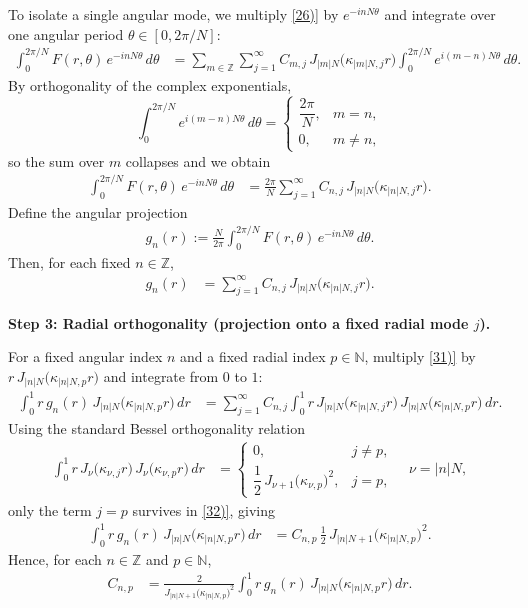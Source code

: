 \documentclass{article}
\begin{document}
To isolate a single angular mode, we multiply \eqref{26)} by
\(e^{-i nN\theta}\) and integrate over one angular period
\(\theta \in [0,2\pi/N]\):
\begin{align}
\int_0^{2\pi/N} F(r,\theta)\,e^{-i nN\theta}\,d\theta
&=
\sum_{m\in\mathbb{Z}}\sum_{j=1}^{\infty}
C_{m,j}\,J_{|m|N}\bigl(\kappa_{|m|N,j} r\bigr)
\int_0^{2\pi/N} e^{i (m-n)N\theta}\,d\theta. \tag{28)}
\end{align}
By orthogonality of the complex exponentials,
\[
\int_0^{2\pi/N} e^{i (m-n)N\theta}\,d\theta
=
\begin{cases}
\dfrac{2\pi}{N}, & m=n,\\[0.4em]
0, & m\neq n,
\end{cases}
\]
so the sum over \(m\) collapses and we obtain
\begin{align}
\int_0^{2\pi/N} F(r,\theta)\,e^{-i nN\theta}\,d\theta
&=
\frac{2\pi}{N}
\sum_{j=1}^{\infty}
C_{n,j}\,J_{|n|N}\bigl(\kappa_{|n|N,j} r\bigr). \tag{29)}
\end{align}
Define the angular projection
\begin{align}
g_n(r)
:=
\frac{N}{2\pi}
\int_0^{2\pi/N} F(r,\theta)\,e^{-i nN\theta}\,d\theta.
\tag{30)}
\end{align}
Then, for each fixed \(n\in\mathbb{Z}\),
\begin{align}
g_n(r)
&=
\sum_{j=1}^{\infty}
C_{n,j}\,J_{|n|N}\bigl(\kappa_{|n|N,j} r\bigr). \tag{31)}
\end{align}

\medskip

\noindent
\textbf{Step 3: Radial orthogonality (projection onto a fixed radial mode \(j\)).}

For a fixed angular index \(n\) and a fixed radial index \(p\in\mathbb{N}\),
multiply \eqref{31)} by \(r\,J_{|n|N}\bigl(\kappa_{|n|N,p} r\bigr)\) and integrate
from \(0\) to \(1\):
\begin{align}
\int_0^1 r\,g_n(r)\,J_{|n|N}\bigl(\kappa_{|n|N,p} r\bigr)\,dr
&=
\sum_{j=1}^{\infty} C_{n,j}
\int_0^1 r\,J_{|n|N}\bigl(\kappa_{|n|N,j} r\bigr)\,
J_{|n|N}\bigl(\kappa_{|n|N,p} r\bigr)\,dr. \tag{32)}
\end{align}
Using the standard Bessel orthogonality relation
\begin{align}
\int_0^1 r\,J_{\nu}\bigl(\kappa_{\nu,j} r\bigr)\,
J_{\nu}\bigl(\kappa_{\nu,p} r\bigr)\,dr
&=
\begin{cases}
0, & j\neq p,\\[0.4em]
\dfrac{1}{2}\,J_{\nu+1}\bigl(\kappa_{\nu,p}\bigr)^2, & j=p,
\end{cases}
\quad \nu = |n|N, \tag{33)}
\end{align}
only the term \(j=p\) survives in \eqref{32)}, giving
\begin{align}
\int_0^1 r\,g_n(r)\,J_{|n|N}\bigl(\kappa_{|n|N,p} r\bigr)\,dr
&=
C_{n,p}\,\frac{1}{2}\,
J_{|n|N+1}\bigl(\kappa_{|n|N,p}\bigr)^2. \tag{34)}
\end{align}
Hence, for each \(n\in\mathbb{Z}\) and \(p\in\mathbb{N}\),
\begin{align}
C_{n,p}
&=
\frac{2}{J_{|n|N+1}\bigl(\kappa_{|n|N,p}\bigr)^2}
\int_0^1 r\,g_n(r)\,J_{|n|N}\bigl(\kappa_{|n|N,p} r\bigr)\,dr. \tag{35)}
\end{align}
\end{document}
